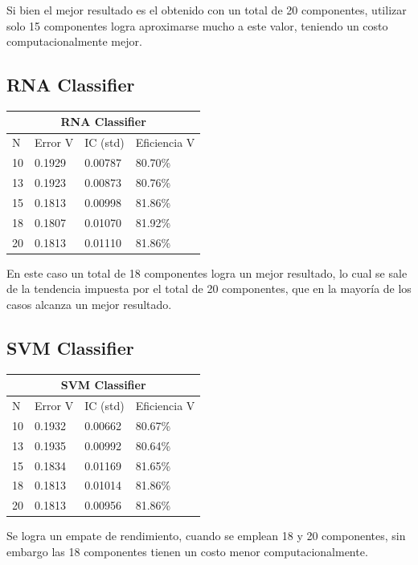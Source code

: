 \documentclass[conference]{IEEEtran}
\begin{document}
Si bien el mejor resultado es el obtenido con un total de 20 componentes, utilizar solo 15 componentes logra aproximarse mucho a este valor, teniendo un costo computacionalmente mejor.
\subsection{RNA Classifier}\hfill

\begin{table}[h]
\centering
\begin{tabular}{llll}
\hline
\multicolumn{4}{c}{\textbf{RNA Classifier}} \\ \hline
N & Error V & IC (std) & Eficiencia V \\ \hline
10 & 0.1929 & 0.00787 & 80.70\% \\
13 & 0.1923 & 0.00873 & 80.76\% \\
15 & 0.1813 & 0.00998 & 81.86\% \\
18 & 0.1807 & 0.01070 & 81.92\% \\
20 & 0.1813 & 0.01110 & 81.86\% \\\hline
\end{tabular}
\end{table}
En este caso un total de 18 componentes logra un mejor resultado, lo cual se sale de la tendencia impuesta por el total de 20 componentes, que en la mayoría de los casos alcanza un mejor resultado.
\subsection{SVM Classifier}\hfill

\begin{table}[H]
\centering
\begin{tabular}{llll}
\hline
\multicolumn{4}{c}{\textbf{SVM Classifier}} \\ \hline
N & Error V & IC (std) & Eficiencia V \\ \hline
10 & 0.1932 & 0.00662 & 80.67\% \\
13 & 0.1935 & 0.00992 & 80.64\% \\
15 & 0.1834 & 0.01169 & 81.65\% \\
18 & 0.1813 & 0.01014 & 81.86\% \\
20 & 0.1813 & 0.00956 & 81.86\% \\\hline
\end{tabular}
\end{table}
Se logra un empate de rendimiento, cuando se emplean 18 y 20 componentes, sin embargo las 18 componentes tienen un costo menor computacionalmente.
\end{document}
